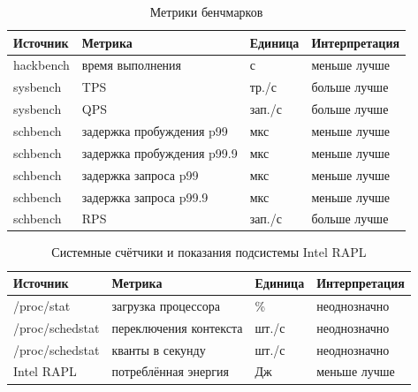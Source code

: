 \documentclass[14pt, oneside]{extbook}
\begin{document}
        \begin{table}[h]
                \centering
                \caption{Метрики бенчмарков}
                \label{tab:metrics-bench}
                \vspace{0.4em}
                \begin{tabular}{|l|P{4.5cm}|l|l|}
                        \hline
                        Источник & Метрика & Единица & Интерпретация \\
                        \hline
                        hackbench & время выполнения & с & меньше лучше \\
                        \hline
                        sysbench & TPS & тр./с & больше лучше \\
                        sysbench & QPS & зап./с & больше лучше \\
                        \hline
                        schbench & задержка пробуждения p99 & мкс & меньше лучше \\
                        schbench & задержка пробуждения p99.9 & мкс & меньше лучше \\
                        schbench & задержка запроса p99 & мкс & меньше лучше \\
                        schbench & задержка запроса p99.9 & мкс & меньше лучше \\
                        schbench & RPS & зап./с & больше лучше \\
                        \hline
                \end{tabular}
        \end{table}

        \begin{table}[h]
                \centering
                \caption{Системные счётчики и показания подсистемы Intel RAPL}
                \label{tab:metrics-sys}
                \vspace{0.4em}
                \begin{tabular}{|l|P{4.0cm}|l|l|}
                        \hline
                        Источник & Метрика & Единица & Интерпретация \\
                        \hline
                        /proc/stat & загрузка процессора & \% & неоднозначно \\
                        /proc/schedstat & переключения контекста & шт./с & неоднозначно \\
                        /proc/schedstat & кванты в секунду & шт./с & неоднозначно \\
                        \hline
                        Intel RAPL & потреблённая энергия & Дж & меньше лучше \\
                        \hline
                \end{tabular}
        \end{table}
\end{document}
